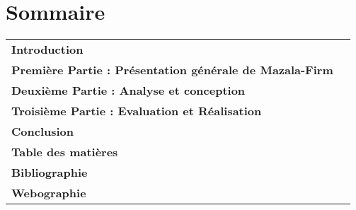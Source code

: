 \documentclass[12pt, french]{extreport}
\begin{document}







\listoffigures
{}
\listoftables
{}

\chapter*{Sommaire}
\noindent\begin{tabularx}{\textwidth}{Xr}
  \textbf{Introduction} \dotfill \pageref{chap:introduction} \\

  \textbf{Première Partie : Présentation générale de Mazala-Firm} \dotfill \pageref{part:presentation} \\

  \textbf{Deuxième Partie : Analyse et conception} \dotfill \pageref{part:analyse-et-conception} \\

  \textbf{Troisième Partie : Evaluation et Réalisation} \dotfill \pageref{part:evaluation-et-realisation} \\

  \textbf{Conclusion} \dotfill \pageref{chap:conclusion} \\

  \textbf{Table des matières} \dotfill \pageref{sec:tableofcontents} \\

  \textbf{Bibliographie} \dotfill \pageref{sec:bibliographie} \\

  \textbf{Webographie} \dotfill \pageref{sec:webographie} \\
\end{tabularx}






\newpage










\tableofcontents
\label{sec:tableofcontents}
\end{document}

